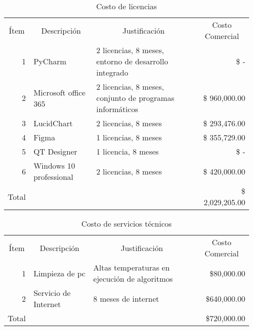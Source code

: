 \begin{table}[H]
    \centering
    \caption{Costo de licencias}
    \footnotesize
    \begin{tabular}{crrr}
        \hline
        Ítem & \multicolumn{1}{c}{Descripción} & \multicolumn{1}{c}{Justificación} & \multicolumn{1}{c}{Costo Comercial} \bigstrut\\
    \cline{2-4}    \multicolumn{1}{r}{1} & \multicolumn{1}{l}{PyCharm} & \multicolumn{1}{l}{2 licencias, 8 meses, entorno de desarrollo integrado		} &  \$                       -    \bigstrut[t]\\
        \multicolumn{1}{r}{2} & \multicolumn{1}{l}{Microsoft office 365} & \multicolumn{1}{l}{2 licencias, 8 meses,  conjunto de programas informáticos 		} &  \$      960,000.00  \\
        \multicolumn{1}{r}{3} & \multicolumn{1}{l}{LucidChart} & \multicolumn{1}{l}{2 licencias, 8 meses		} &  \$      293,476.00  \\
        \multicolumn{1}{r}{4} & \multicolumn{1}{l}{Figma} & \multicolumn{1}{l}{1 licencias, 8 meses		} &  \$      355,729.00  \\
        \multicolumn{1}{r}{5} & \multicolumn{1}{l}{QT Designer} & \multicolumn{1}{l}{1 licencia, 8 meses		} &  \$                       -    \\
        \multicolumn{1}{r}{6} & \multicolumn{1}{l}{Windows 10 professional} & \multicolumn{1}{l}{2 licencias, 8 meses		} &  \$      420,000.00  \bigstrut[b]\\
    \cline{2-4}    Total &   &   &  \$   2,029,205.00  \bigstrut\\
        \hline
    \end{tabular}%
  \label{tab:licencias}%
\end{table}%

\begin{table}[H]
    \centering
    \caption{Costo de servicios técnicos}
    \footnotesize
    \begin{tabular}{crrr}
        \hline
        Ítem & \multicolumn{1}{c}{Descripción} & \multicolumn{1}{c}{Justificación} & \multicolumn{1}{c}{Costo Comercial} \bigstrut\\
    \cline{2-4}    \multicolumn{1}{r}{1} & \multicolumn{1}{l}{Limpieza de pc} & \multicolumn{1}{l}{Altas temperaturas en ejecución de algoritmos} & \$80,000.00  \bigstrut[t]\\
        \multicolumn{1}{r}{2} & \multicolumn{1}{l}{Servicio de Internet} & \multicolumn{1}{l}{8 meses de internet} & \$640,000.00  \bigstrut[b]\\
    \cline{2-4}    Total &   &   & \$720,000.00  \bigstrut\\
        \hline
    \end{tabular}%
  \label{tab:serviciotec}%
\end{table}%

